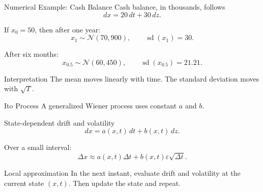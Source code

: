 \documentclass[aspectratio=169,11pt]{beamer}
\newcommand{\dt}{\Delta t}
\newcommand{\eps}{\varepsilon}
\newcommand{\Normal}{\mathcal{N}}
\begin{document}
\begin{frame}{Numerical Example: Cash Balance}
    Cash balance, in thousands, follows
    \[
        dx=20\,dt+30\,dz.
    \]

    If \(x_0=50\), then after one year:
    \[
        x_1\sim\Normal(70,900),
        \qquad
        \operatorname{sd}(x_1)=30.
    \]

    After six months:
    \[
        x_{0.5}\sim\Normal(60,450),
        \qquad
        \operatorname{sd}(x_{0.5})=21.21.
    \]

    \begin{block}{Interpretation}
        The mean moves linearly with time.
        The standard deviation moves with \(\sqrt{T}\).
    \end{block}
\end{frame}

\begin{frame}{Ito Process}
    A generalized Wiener process uses constant \(a\) and \(b\).

    \begin{block}{State-dependent drift and volatility}
        \[
            dx=a(x,t)\,dt+b(x,t)\,dz.
        \]
    \end{block}

    Over a small interval:
    \[
        \Delta x
        \approx
        a(x,t)\dt+b(x,t)\eps\sqrt{\dt}.
    \]

    \begin{alertblock}{Local approximation}
        In the next instant, evaluate drift and volatility at the current state \((x,t)\).
        Then update the state and repeat.
    \end{alertblock}
\end{frame}
\end{document}
